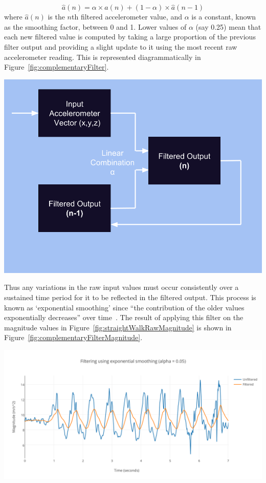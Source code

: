 \documentclass[12pt,a4paper]{report}
\begin{document}
\begin{equation}\label{eq:lowPass}
\hat{a}(n) = \alpha \times a(n) + (1 - \alpha) \times \hat{a}(n-1)
\end{equation}
where $\hat{a}(n)$ is the $n$th filtered accelerometer value, and $\alpha$ is a constant, known as the smoothing factor, between 0 and 1. Lower values of $\alpha$ (say 0.25) mean that each new filtered value is computed by taking a large proportion of the previous filter output and providing a slight update to it using the most recent raw accelerometer reading. This is represented diagrammatically in Figure~\ref{fig:complementaryFilter}.  

\begin{center}
\includegraphics[scale=0.3]{images/complementaryFilter.png}
\label{fig:complementaryFilter}
\end{center}
Thus any variations in the raw input values must occur consistently over a sustained time period for it to be reflected in the filtered output. This process is known as `exponential smoothing' since ``the contribution of the older values exponentially decreases'' over time~\cite[p.2528]{casiez20121}. The result of applying this filter on the magnitude values in Figure~\ref{fig:straightWalkRawMagnitude} is shown in Figure~\ref{fig:complementaryFilterMagnitude}. 

\begin{center}
\includegraphics[scale=0.9]{images/complementaryFilterMagnitude.png}
\label{fig:complementaryFilterMagnitude}
\end{center}
\end{document}

